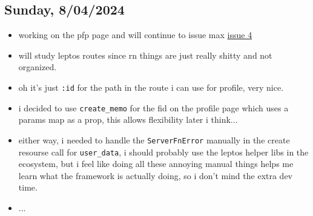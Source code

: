 \subsection*{Sunday, 8/04/2024}
\begin{itemize}
    \item working on the pfp page and will continue to issue max  
        \textcolor{blue}{\href{https://github.com/iturner72/thenetworktimes/issues/4}{issue 4}}
    \item will study leptos routes since rn things are just really shitty and
        not organized.
    \item oh it's just \texttt{:id} for the path in the route i can use for
        profile, very nice.
    \item i decided to use \texttt{create_memo} for the fid on the profile page
        which uses a params map as a prop, this allows flexibility later i
        think...
    \item either way, i needed to handle the \texttt{ServerFnError} manually in
        the create resourse call for \texttt{user_data}, i should probably use
        the leptos helper libs in the ecosystem, but i feel like doing all these
        annoying manual things helps me learn what the framework is actually
        doing, so i don't mind the extra dev time.
    \item ...
\end{itemize}

